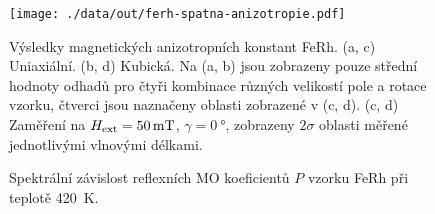 \begin{figure}[htbp]
    \centering
    \texttt{[image: ./data/out/ferh-spatna-anizotropie.pdf]}
    \caption{Výsledky magnetických anizotropních konstant FeRh. (a, c) Uniaxiální. (b, d) Kubická. Na (a, b) jsou zobrazeny pouze střední hodnoty odhadů pro čtyři kombinace různých velikostí pole a rotace vzorku, čtverci jsou naznačeny oblasti zobrazené v (c, d). (c, d) Zaměření na $H_\textrm{ext}=\SI{50}{\milli\tesla}$, $\gamma=\SI{0}{\degree}$, zobrazeny $2\sigma$ oblasti měřené jednotlivými vlnovými délkami.}
    \label{fig:ferh-anizotropie}
\end{figure}

\begin{figure}[htbp]
    \centering
    \missingfigure{}
    \caption{Spektrální závislost reflexních MO koeficientů $P$ vzorku FeRh při teplotě \SI{420}{\kelvin}.}
    \label{fig:ferh-fm-pmld}
\end{figure}

